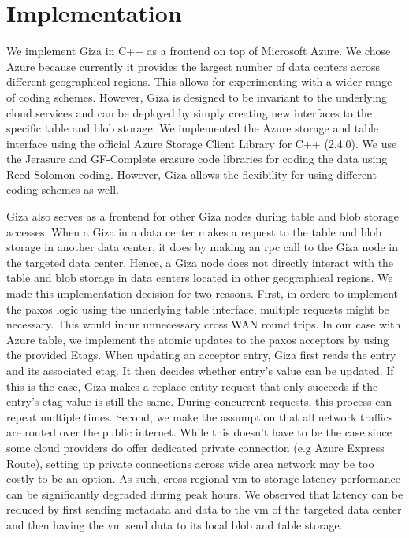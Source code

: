 \section{Implementation}
We implement Giza in C++ as a frontend on top of Microsoft Azure. We chose Azure because currently it provides the largest number of data centers across different geographical regions. This allows for experimenting with a wider range of coding schemes. However, Giza is designed to be invariant to the underlying cloud services and can be deployed by simply creating new interfaces to the specific table and blob storage. We implemented the Azure storage and table interface using the official Azure Storage Client Library for C++ (2.4.0). We use the Jerasure and GF-Complete erasure code libraries for coding the data using Reed-Solomon coding. However, Giza allows the flexibility for using different coding schemes as well.

Giza also serves as a frontend for other Giza nodes during table and blob storage accesses. When a Giza in a data center makes a request to the table and blob storage in another data center, it does by making an rpc call to the Giza node in the targeted data center. Hence, a Giza node does not directly interact with the table and blob storage in data centers located in other geographical regions. We made this implementation decision for two reasons. First, in ordere to implement the paxos logic using the underlying table interface, multiple requests might be necessary. This would incur unnecessary cross WAN round trips. In our case with Azure table, we implement the atomic updates to the paxos acceptors by using the provided Etags. When updating an acceptor entry, Giza first reads the entry and its associated etag. It then decides whether entry's value can be updated. If this is the case, Giza makes a replace entity request that only succeeds if the entry's etag value is still the same. During concurrent requests, this process can repeat multiple times. Second, we make the assumption that all network traffics are routed over the public internet. While this doesn't have to be the case since some cloud providers do offer dedicated private connection (e.g Azure Express Route), setting up private connections across wide area network may be too costly to be an option. As such, cross regional vm to storage latency performance can be significantly degraded during peak hours. We observed that latency can be reduced by first sending metadata and data to the vm of the targeted data center and then having the vm send data to its local blob and table storage. 

